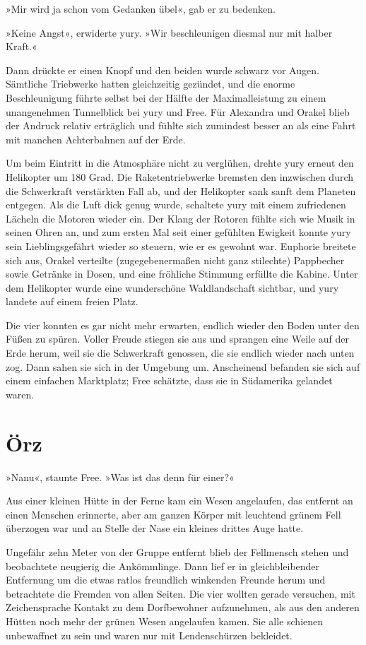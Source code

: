 »Mir wird ja schon vom Gedanken übel«, gab er zu bedenken.

»Keine Angst«, erwiderte yury. »Wir beschleunigen diesmal nur mit halber Kraft.«

Dann drückte er einen Knopf und den beiden wurde schwarz vor Augen. Sämtliche Triebwerke hatten gleichzeitig gezündet, und die enorme Beschleunigung führte selbst bei der Hälfte der Maximalleistung zu einem unangenehmen Tunnelblick bei yury und Free. Für Alexandra und Orakel blieb der Andruck relativ erträglich und fühlte sich zumindest besser an als eine Fahrt mit manchen Achterbahnen auf der Erde.

Um beim Eintritt in die Atmosphäre nicht zu verglühen, drehte yury erneut den Helikopter um 180 Grad. Die Raketentriebwerke bremsten den inzwischen durch die Schwerkraft verstärkten Fall ab, und der Helikopter sank sanft dem Planeten entgegen. Als die Luft dick genug wurde, schaltete yury mit einem zufriedenen Lächeln die Motoren wieder ein. Der Klang der Rotoren fühlte sich wie Musik in seinen Ohren an, und zum ersten Mal seit einer gefühlten Ewigkeit konnte yury sein Lieblingsgefährt wieder so steuern, wie er es gewohnt war. Euphorie breitete sich aus, Orakel verteilte (zugegebenermaßen nicht ganz stilechte) Pappbecher sowie Getränke in Dosen, und eine fröhliche Stimmung erfüllte die Kabine. Unter dem Helikopter wurde eine wunderschöne Waldlandschaft sichtbar, und yury landete auf einem freien Platz.

Die vier konnten es gar nicht mehr erwarten, endlich wieder den Boden unter den Füßen zu spüren. Voller Freude stiegen sie aus und sprangen eine Weile auf der Erde herum, weil sie die Schwerkraft genossen, die sie endlich wieder nach unten zog. Dann sahen sie sich in der Umgebung um. Anscheinend befanden sie sich auf einem einfachen Marktplatz; Free schätzte, dass sie in Südamerika gelandet waren.


\chapter{Örz}

»Nanu«, staunte Free. »Was ist das denn für einer?«

Aus einer kleinen Hütte in der Ferne kam ein Wesen angelaufen, das entfernt an einen Menschen erinnerte, aber am ganzen Körper mit leuchtend grünem Fell überzogen war und an Stelle der Nase ein kleines drittes Auge hatte.

Ungefähr zehn Meter von der Gruppe entfernt blieb der Fellmensch stehen und beobachtete neugierig die Ankömmlinge. Dann lief er in gleichbleibender Entfernung um die etwas ratlos freundlich winkenden Freunde herum und betrachtete die Fremden von allen Seiten. Die vier wollten gerade versuchen, mit Zeichensprache Kontakt zu dem Dorfbewohner aufzunehmen, als aus den anderen Hütten noch mehr der grünen Wesen angelaufen kamen. Sie alle schienen unbewaffnet zu sein und waren nur mit Lendenschürzen bekleidet.

